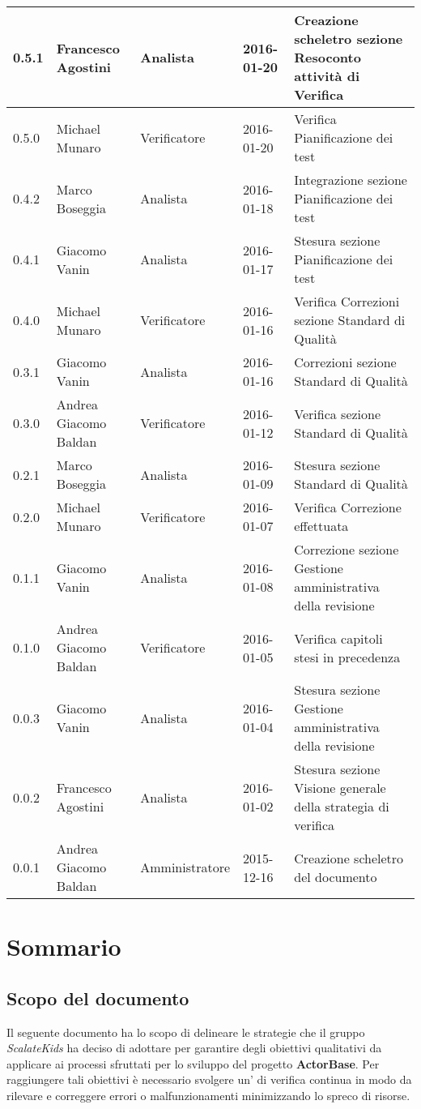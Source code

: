 \documentclass{scalatekids-article}
\begin{document}
\begin{center}
\begin{longtable}{| l | l | l | l | p{5cm} |}
    \hline
    0.5.1 & Francesco Agostini & Analista & 2016-01-20 & Creazione scheletro sezione Resoconto attività di Verifica\\
    \hline
    0.5.0 & Michael Munaro & Verificatore & 2016-01-20 & Verifica Pianificazione dei test\\
    \hline
    0.4.2 & Marco Boseggia & Analista & 2016-01-18 & Integrazione sezione Pianificazione dei test\\
    \hline
    0.4.1 & Giacomo Vanin & Analista & 2016-01-17 & Stesura sezione Pianificazione dei test\\
    \hline
    0.4.0 & Michael Munaro & Verificatore & 2016-01-16 & Verifica Correzioni sezione Standard di Qualità\\
    \hline
    0.3.1 & Giacomo Vanin & Analista & 2016-01-16 & Correzioni sezione Standard di Qualità\\
    \hline
    0.3.0 & Andrea Giacomo Baldan & Verificatore & 2016-01-12 & Verifica sezione Standard di Qualità\\
    \hline
    0.2.1 & Marco Boseggia & Analista & 2016-01-09 & Stesura sezione Standard di Qualità\\
    \hline
    0.2.0 & Michael Munaro & Verificatore & 2016-01-07 & Verifica Correzione effettuata\\
    \hline
    0.1.1 & Giacomo Vanin & Analista & 2016-01-08 & Correzione sezione Gestione amministrativa della revisione\\
    \hline
    0.1.0 & Andrea Giacomo Baldan & Verificatore & 2016-01-05 & Verifica capitoli stesi in precedenza\\
    \hline
    0.0.3 & Giacomo Vanin & Analista & 2016-01-04 & Stesura sezione Gestione amministrativa della revisione\\
    \hline
    0.0.2 & Francesco Agostini & Analista & 2016-01-02 & Stesura sezione Visione generale della strategia di verifica\\
    \hline
    0.0.1 & Andrea Giacomo Baldan & Amministratore & 2015-12-16 & Creazione scheletro del documento\\
    \hline
  \end{longtable}
\end{center}
\tableofcontents
\newpage
{}
\section{Sommario}
\subsection{Scopo del documento}
Il seguente documento ha lo scopo di delineare le strategie che il gruppo \textit{ScalateKids} ha deciso di adottare per garantire degli obiettivi qualitativi da applicare ai processi sfruttati per lo sviluppo del progetto \textbf{ActorBase}. Per raggiungere tali obiettivi è necessario svolgere un' di verifica continua in modo da rilevare e correggere errori o malfunzionamenti minimizzando lo spreco di risorse.
\prodPurpose
\glossExpl
\end{document}
